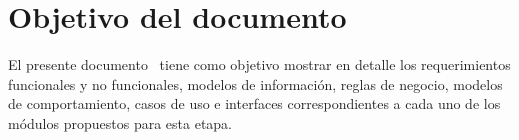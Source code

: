 

	
\section{Objetivo del documento}
    

	El presente documento \varCveDocumento\ tiene como objetivo mostrar en detalle los requerimientos funcionales y no funcionales, modelos de información, reglas de negocio, modelos de comportamiento, casos de uso e interfaces correspondientes a cada uno de los módulos propuestos para esta etapa.
	
